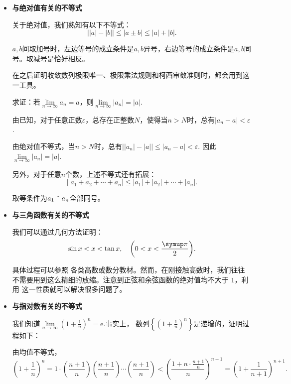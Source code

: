 \begin{itemize}
    \item \textbf{与绝对值有关的不等式}

          关于绝对值，我们熟知有以下不等式：
          \[
              \big | \lvert a \rvert-\lvert b\rvert  \big |
              \leqslant \lvert a\pm b\rvert \leqslant \lvert a\rvert +\lvert b\rvert
              .\]

          $a,b$间取加号时，左边等号的成立条件是$a,b$异号，右边等号的成立条件是$a,b$同号。取减号是恰好相反。

          在之后证明收敛数列极限唯一、极限乘法规则和柯西审敛准则时，都会用到这一工具。
          \begin{example}
              求证：若$\lim\limits_{n \to \infty} a_n =a$，则$\lim\limits_{n \to \infty} |a_n| =|a|$.
          \end{example}
          \begin{prove}
              由已知，对于任意正数$\varepsilon$，总存在正整数$N$，使得当$n>N$时，总有$|a_n-a|<\varepsilon$.


              由绝对值不等式，当$n>N$时，总有$\big ||a_n|-|a|\big |\leqslant |a_n-a|<\varepsilon$.
              因此$\lim\limits_{n \to \infty} |a_n| =|a|$.
          \end{prove}
          另外，对于任意$n$个数，上述不等式还有拓展：
          \[
              |\;\!a_1+a_2+\cdots +a_n|\leqslant |a_1|+|a_2|+\cdots +|a_n|
              .\]

          取等条件为$a_1\mathrel{\char"007E}a_n$全部同号。
    \item \textbf{与三角函数有关的不等式}

          我们可以通过几何方法证明：
          \[
              \sin x<x<\tan x,\quad\left( 0<x<\frac{\symup\pi}{2} \right)
              .\]

          具体过程可以参照%
          各类高数或数分教材。然而，在刚接触高数时，我们往往不需要用到这么精细的放缩。注意到正弦和余弦函数的绝对值均不大于 $1$，利用
          这一性质就可以解决很多问题了。

    \item \textbf{与指对数有关的不等式}

          我们知道$\lim\limits_{n \to \infty}\left (1+\frac{1}{n}\right )^n=\mathrm e$.事实上，
          数列$\left\{ \left (1+\frac{1}{n}\right )^n  \right\} $是递增的，证明过程如下：
          \begin{prove}
              由均值不等式，
              \[
                  \left (1+\frac{1}{n}\right )^n=1\cdot \left (\frac{n+1}{n}\right )\left (\frac{n+1}{n}\right )
                  \cdots \left (\frac{n+1}{n}\right )<
                  \left (\frac{1+n\cdot \frac{n+1}{n}}{n}\right )^{n+1}=\left (1+\frac{1}{n+1}\right )^{n+1}
                  .\]
          \end{prove}



\end{itemize}
